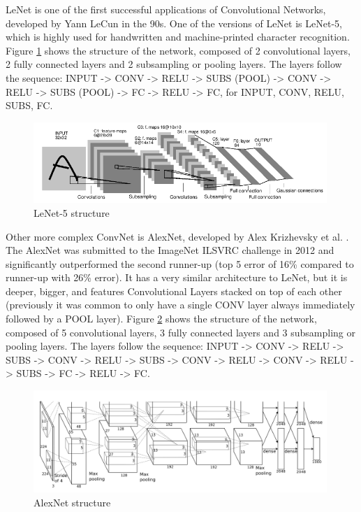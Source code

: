 \documentclass[]{article}
\begin{document}
LeNet is one of the first successful applications of Convolutional Networks, developed by Yann LeCun in the 90s. One of the versions of LeNet is LeNet-5, which is highly used for handwritten and machine-printed character recognition. Figure \ref{img:lenet5} shows the structure of the network, composed of 2 convolutional layers, 2 fully connected layers and 2 subsampling or pooling layers. The layers follow the sequence: INPUT -> CONV -> RELU -> SUBS (POOL) -> CONV -> RELU -> SUBS (POOL) -> FC -> RELU -> FC, for INPUT, CONV, RELU, SUBS, FC. %
\begin{figure}[htpb!]
\centering
\includegraphics[width= 0.99\textwidth]{images/lenet5}
\caption{LeNet-5 structure \cite{Lecun98} \label{img:lenet5}}
\end{figure}

Other more complex ConvNet is AlexNet, developed by Alex Krizhevsky et al. \cite{Krizhevsky12}. The AlexNet was submitted to the ImageNet ILSVRC challenge in 2012 and significantly outperformed the second runner-up (top 5 error of 16\% compared to runner-up with 26\% error). It has a very similar architecture to LeNet, but it is  deeper, bigger, and features Convolutional Layers stacked on top of each other (previously it was common to only have a single CONV layer always immediately followed by a POOL layer)\cite{cs231convnets}. Figure \ref{img:imagenet12} shows the structure of the network, composed of 5 convolutional layers, 3 fully connected layers and 3 subsampling or pooling layers. The layers follow the sequence: INPUT -> CONV -> RELU -> SUBS -> CONV -> RELU -> SUBS -> CONV -> RELU -> CONV -> RELU -> SUBS -> FC -> RELU -> FC. %


\begin{figure}[htpb!]
\centering
\includegraphics[width= 0.99\textwidth]{images/imagenet12}
\caption{AlexNet structure\cite{Krizhevsky12} \label{img:imagenet12}}
\end{figure}
\end{document}
